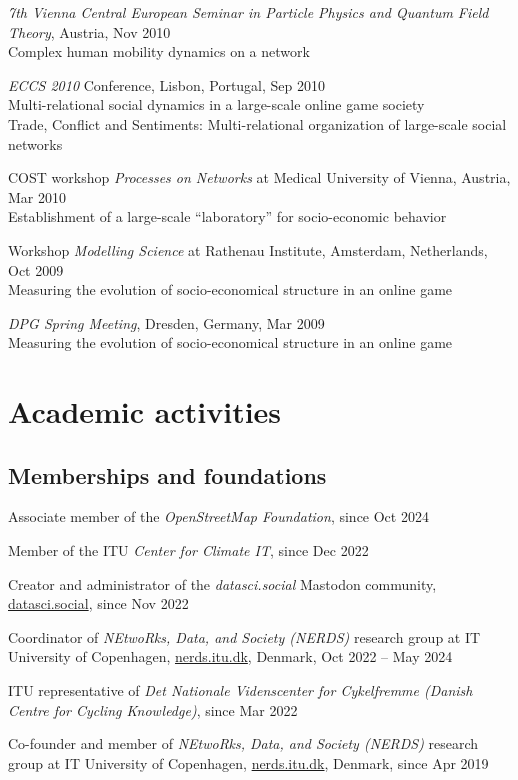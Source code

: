 \documentclass[10pt,a4paper]{article}
\renewenvironment{itemize}{
  \begin{list}{}{
    \setlength{\leftmargin}{1.5em}
    \setlength{\itemsep}{0.25em}
    \setlength{\parskip}{0pt}
    \setlength{\parsep}{0.25em}
  }
}{
  \end{list}
}
\begin{document}
\begin{itemize}
\item{\emph{7th Vienna Central European Seminar in Particle Physics and Quantum Field Theory}, Austria, Nov 2010\\ {Complex human mobility dynamics on a network}}
\item{\emph{ECCS 2010} Conference, Lisbon, Portugal, Sep 2010\\ {Multi-relational social dynamics in a large-scale online game society}\\ {Trade, Conflict and Sentiments: Multi-relational organization of large-scale social networks}}
\item{COST workshop \emph{Processes on Networks} at Medical University of Vienna, Austria, Mar 2010\\ {Establishment of a large-scale ``laboratory'' for socio-economic behavior}}
\item{Workshop \emph{Modelling Science} at Rathenau Institute, Amsterdam, Netherlands, Oct 2009\\ {Measuring the evolution of socio-economical structure in an online game}}
\item{\emph{DPG Spring Meeting}, Dresden, Germany, Mar 2009\\ {Measuring the evolution of socio-economical structure in an online game}}
\end{itemize}


\section*{Academic activities}
\subsection*{Memberships and foundations}
\begin{itemize}
\item{Associate member of the \emph{OpenStreetMap Foundation}, since Oct 2024}
\item{Member of the ITU \emph{Center for Climate IT}, since Dec 2022}
\item{Creator and administrator of the \emph{datasci.social} Mastodon community, \href{https://datasci.social/}{datasci.social}, since Nov 2022}
\item{Coordinator of \emph{NEtwoRks, Data, and Society (NERDS)} research group at IT University of Copenhagen, \href{https://nerds.itu.dk}{nerds.itu.dk}, Denmark, Oct 2022 -- May 2024}
\item{ITU representative of \emph{Det Nationale Videnscenter for Cykelfremme (Danish Centre for Cycling Knowledge)}, since Mar 2022}
\item{Co-founder and member of \emph{NEtwoRks, Data, and Society (NERDS)} research group at IT University of Copenhagen, \href{https://nerds.itu.dk}{nerds.itu.dk}, Denmark, since Apr 2019}
\end{itemize}
\end{document}
